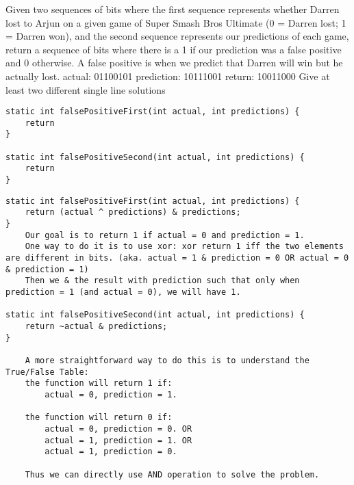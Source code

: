 
\question Given two sequences of bits where the first sequence represents whether Darren lost to Arjun on a given game of Super Smash Bros Ultimate (0 = Darren lost; 1 = Darren won), and the second sequence represents our predictions of each game, return a sequence of bits where there is a 1 if our prediction was a false positive and 0 otherwise. A false positive is when we predict that Darren will win but he actually lost. \newline
actual:     01100101 \newline
prediction: 10111001 \newline
return:     10011000 \newline
Give at least two different single line solutions

\ifprintanswers\else
\begin{lstlisting}
static int falsePositiveFirst(int actual, int predictions) {
    return
}

static int falsePositiveSecond(int actual, int predictions) {
    return
}
\end{lstlisting}
\fi

\begin{solution}
\begin{lstlisting}
static int falsePositiveFirst(int actual, int predictions) {
    return (actual ^ predictions) & predictions;
}
    Our goal is to return 1 if actual = 0 and prediction = 1. 
    One way to do it is to use xor: xor return 1 iff the two elements are different in bits. (aka. actual = 1 & prediction = 0 OR actual = 0 & prediction = 1)
    Then we & the result with prediction such that only when prediction = 1 (and actual = 0), we will have 1.

static int falsePositiveSecond(int actual, int predictions) {
    return ~actual & predictions;
}

    A more straightforward way to do this is to understand the True/False Table:
    the function will return 1 if:
        actual = 0, prediction = 1. 
        
    the function will return 0 if:
        actual = 0, prediction = 0. OR 
        actual = 1, prediction = 1. OR 
        actual = 1, prediction = 0. 
        
    Thus we can directly use AND operation to solve the problem. 
\end{lstlisting}
\end{solution}